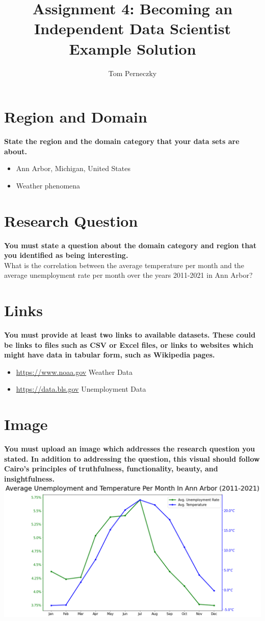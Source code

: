 \documentclass[12pt]{article}
\title{Assignment 4: Becoming an Independent Data Scientist Example Solution}
\author{Tom Perneczky}
\begin{document}
	\maketitle
	\section{Region and Domain}
	\textbf{State the region and the domain category that your data sets are about.}\\
	\begin{itemize}
		\item Ann Arbor, Michigan, United States
		\item Weather phenomena
	\end{itemize}
	\section{Research Question}
	\textbf{You must state a question about the domain category and region that you identified as being interesting.}\\
	What is the correlation between the average temperature per month and the average unemployment rate per month over the years 2011-2021 in Ann Arbor?
	\section{Links}
	\textbf{You must provide at least two links to available datasets. These could be links to files such as CSV or Excel files, or links to websites which might have data in tabular form, such as Wikipedia pages.}\\
	\begin{itemize}
		\item \href{https://www.noaa.gov}{https://www.noaa.gov} Weather Data
		\item \href{https://data.bls.gov/timeseries/LAUMT261146000000003?amp%253bdata_tool=XGtable&output_view=data&include_graphs=true}{https://data.bls.gov} Unemployment Data
	\end{itemize}
	\section{Image}
	\textbf{You must upload an image which addresses the research question you stated. In addition to addressing the question, this visual should follow Cairo's principles of truthfulness, functionality, beauty, and insightfulness.}
	\newline
	\newline
	\includegraphics[width=\textwidth]{plot}
\end{document}
